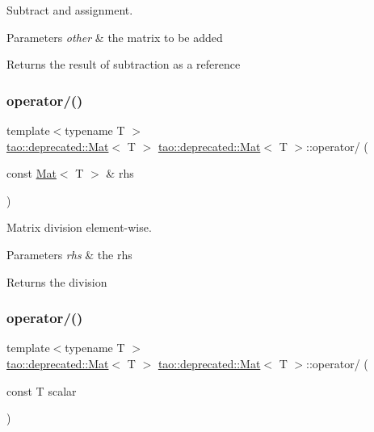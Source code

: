 Subtract and assignment. 


\begin{DoxyParams}{Parameters}
{\em other} & the matrix to be added \\
\hline
\end{DoxyParams}
\begin{DoxyReturn}{Returns}
the result of subtraction as a reference 
\end{DoxyReturn}
\mbox{\label{classtao_1_1deprecated_1_1_mat_af0e5743c7b40425e732d7400b0da3819}} 
\subsubsection{\texorpdfstring{operator/()}{operator/()}\hspace{0.1cm}{\footnotesize\ttfamily [1/2]}}
{\footnotesize\ttfamily template$<$typename T $>$ \\
\mbox{\hyperlink{classtao_1_1deprecated_1_1_mat}{tao\+::deprecated\+::\+Mat}}$<$ T $>$ \mbox{\hyperlink{classtao_1_1deprecated_1_1_mat}{tao\+::deprecated\+::\+Mat}}$<$ T $>$\+::operator/ (\begin{DoxyParamCaption}\item[{const \mbox{\hyperlink{classtao_1_1deprecated_1_1_mat}{Mat}}$<$ T $>$ \&}]{rhs }\end{DoxyParamCaption})}



Matrix division element-\/wise. 


\begin{DoxyParams}{Parameters}
{\em rhs} & the rhs \\
\hline
\end{DoxyParams}
\begin{DoxyReturn}{Returns}
the division 
\end{DoxyReturn}
\mbox{\label{classtao_1_1deprecated_1_1_mat_a1044fc189285722744236c56b7c8d832}} 
\subsubsection{\texorpdfstring{operator/()}{operator/()}\hspace{0.1cm}{\footnotesize\ttfamily [2/2]}}
{\footnotesize\ttfamily template$<$typename T $>$ \\
\mbox{\hyperlink{classtao_1_1deprecated_1_1_mat}{tao\+::deprecated\+::\+Mat}}$<$ T $>$ \mbox{\hyperlink{classtao_1_1deprecated_1_1_mat}{tao\+::deprecated\+::\+Mat}}$<$ T $>$\+::operator/ (\begin{DoxyParamCaption}\item[{const T}]{scalar }\end{DoxyParamCaption})}



